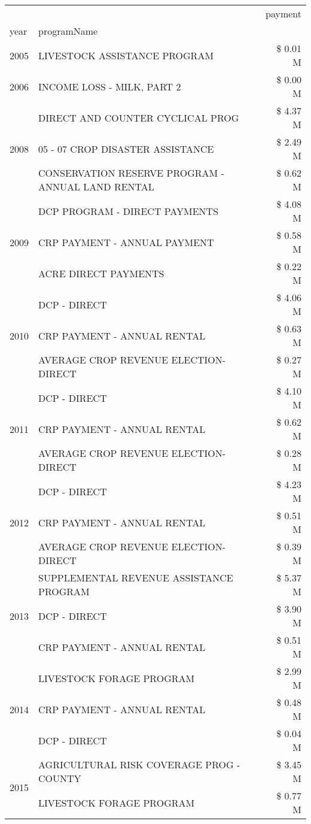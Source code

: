 \begin{tabular}{llr}
\toprule
 &  & payment \\
year & programName &  \\
\midrule
2005 & LIVESTOCK ASSISTANCE PROGRAM & \$ 0.01 M \\
\cline{1-3}
2006 & INCOME LOSS - MILK, PART 2 & \$ 0.00 M \\
\cline{1-3}
\multirow[t]{3}{*}{2008} & DIRECT AND COUNTER CYCLICAL PROG & \$ 4.37 M \\
 & 05 - 07 CROP DISASTER ASSISTANCE & \$ 2.49 M \\
 & CONSERVATION RESERVE PROGRAM - ANNUAL LAND RENTAL & \$ 0.62 M \\
\cline{1-3}
\multirow[t]{3}{*}{2009} & DCP PROGRAM - DIRECT PAYMENTS & \$ 4.08 M \\
 & CRP PAYMENT - ANNUAL PAYMENT & \$ 0.58 M \\
 & ACRE DIRECT PAYMENTS & \$ 0.22 M \\
\cline{1-3}
\multirow[t]{3}{*}{2010} & DCP - DIRECT & \$ 4.06 M \\
 & CRP PAYMENT - ANNUAL RENTAL & \$ 0.63 M \\
 & AVERAGE CROP REVENUE ELECTION-DIRECT & \$ 0.27 M \\
\cline{1-3}
\multirow[t]{3}{*}{2011} & DCP - DIRECT & \$ 4.10 M \\
 & CRP PAYMENT - ANNUAL RENTAL & \$ 0.62 M \\
 & AVERAGE CROP REVENUE ELECTION-DIRECT & \$ 0.28 M \\
\cline{1-3}
\multirow[t]{3}{*}{2012} & DCP - DIRECT & \$ 4.23 M \\
 & CRP PAYMENT - ANNUAL RENTAL & \$ 0.51 M \\
 & AVERAGE CROP REVENUE ELECTION-DIRECT & \$ 0.39 M \\
\cline{1-3}
\multirow[t]{3}{*}{2013} & SUPPLEMENTAL REVENUE ASSISTANCE PROGRAM & \$ 5.37 M \\
 & DCP - DIRECT & \$ 3.90 M \\
 & CRP PAYMENT - ANNUAL RENTAL & \$ 0.51 M \\
\cline{1-3}
\multirow[t]{3}{*}{2014} & LIVESTOCK FORAGE PROGRAM & \$ 2.99 M \\
 & CRP PAYMENT - ANNUAL RENTAL & \$ 0.48 M \\
 & DCP - DIRECT & \$ 0.04 M \\
\cline{1-3}
\multirow[t]{3}{*}{2015} & AGRICULTURAL RISK COVERAGE PROG - COUNTY & \$ 3.45 M \\
 & LIVESTOCK FORAGE PROGRAM & \$ 0.77 M \\

\end{tabular}
